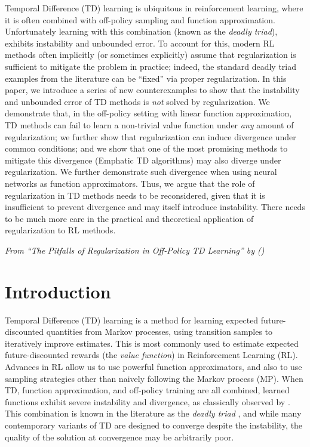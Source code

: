 Temporal Difference (TD) learning is ubiquitous in reinforcement learning, where it is often combined with off-policy sampling and function approximation.  Unfortunately learning with this combination (known as the \emph{deadly triad}), exhibits instability and unbounded error.  To account for this, modern RL methods often implicitly (or sometimes explicitly) assume that regularization is sufficient to mitigate the problem in practice; indeed, the standard deadly triad examples from the literature can be ``fixed'' via proper regularization. In this paper, we introduce a series of new counterexamples to show that the instability and unbounded error of TD methods is \emph{not} solved by regularization. We demonstrate that, in the off-policy setting with linear function approximation, TD methods can fail to learn a non-trivial value function under \emph{any} amount of regularization; we further show that regularization can induce divergence under common conditions; and we show that one of the most promising methods to mitigate this divergence (Emphatic TD algorithms) may also diverge under regularization. We further demonstrate such divergence when using neural networks as function approximators.  Thus, we argue that the role of regularization in TD methods needs to be reconsidered, given that it is insufficient to prevent divergence and may itself introduce instability. There needs to be much more care in the practical and theoretical application of regularization to RL methods.

\emph{From ``The Pitfalls of Regularization in Off-Policy TD Learning'' by \citeauthor{manek2022pitfalls} (\citeyear{manek2022pitfalls})}


\section{Introduction}
Temporal Difference (TD) learning is a method for learning expected future-discounted quantities from Markov processes, using transition samples to iteratively improve estimates. This is most commonly used to estimate expected future-discounted rewards (the \emph{value function}) in Reinforcement Learning (RL). Advances in RL allow us to use powerful function approximators, and also to use sampling strategies other than naively following the Markov process (MP). When TD, function approximation, and off-policy training are all combined, learned functions exhibit severe instability and divergence, as classically observed by \citet{baird1993counterexample,tsitsiklis1996analysis}. This combination is known in the literature as the \emph{deadly triad} \cite[pg.~264]{sutton2020reinforcement}, and while many contemporary variants of TD are designed to converge despite the instability, the quality of the solution at convergence may be arbitrarily poor.

